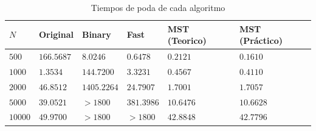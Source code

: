 \documentclass[10pt,a4paper,spanish]{article}
\numberwithin{equation}{section} %
\numberwithin{figure}{section} %
\numberwithin{table}{section} %
\begin{document}
\begin{table}[!h]
\begin{tabular}{llllll}
\hline
$N$ & Original             & Binary               & Fast                 & MST (Teorico)         & MST (Práctico)        \\
\hline
$500$ & $166.5687$   & $8.0246$  & $0.6478$ & $0.2121$ & $0.1610$ \\
$1000$ & $1.3534$  & $144.7200$ & $3.3231$ & $0.4567$ & $0.4110$  \\
$2000$ & $46.8512$  & $1405.2264$ & $24.7907$ & $1.7001$  & $1.7057$  \\
$5000$ & $39.0521$ & $> 1800$               & $381.3986$ & $10.6476$  & $10.6628$  \\
$10000$ & $49.9700$  & $> 1800$               & $> 1800$               & $42.8848$   & $42.7796$   \\
\hline
\end{tabular}
\caption{Tiempos de poda de cada algoritmo}
\label{tiempopoda}
\end{table}
\end{document}
